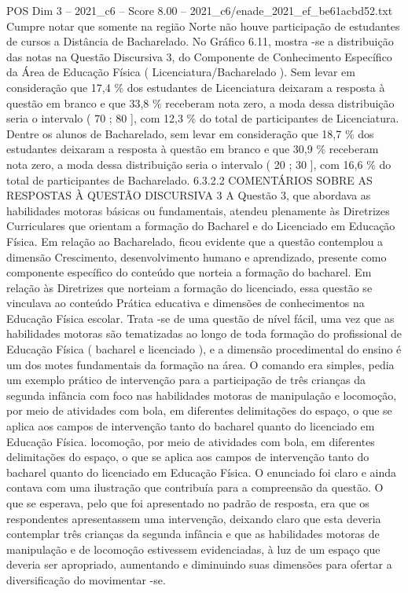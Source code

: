 \begin{textsample}{POS Dim 3 – 2021\_c6 – Score 8.00 – 2021\_c6/enade\_2021\_ef\_be61acbd52.txt}
Cumpre notar que somente na região Norte não houve participação de estudantes de cursos a Distância de Bacharelado.
No Gráfico 6.11, mostra -se a distribuição das notas na Questão Discursiva 3, do Componente de Conhecimento Específico da Área de Educação Física ( Licenciatura/Bacharelado ).
Sem levar em consideração que 17,4 \% dos estudantes de Licenciatura deixaram a resposta à questão em branco e que 33,8 \% receberam nota zero, a moda dessa distribuição seria o intervalo ( 70 ; 80 ], com 12,3 \% do total de participantes de Licenciatura.
Dentre os alunos de Bacharelado, sem levar em consideração que 18,7 \% dos estudantes deixaram a resposta à questão em branco e que 30,9 \% receberam nota zero, a moda dessa distribuição seria o intervalo ( 20 ; 30 ], com 16,6 \% do total de participantes de Bacharelado. 6.3.2.2 COMENTÁRIOS SOBRE AS RESPOSTAS À QUESTÃO DISCURSIVA 3 A Questão 3, que abordava as habilidades motoras básicas ou fundamentais, atendeu plenamente às Diretrizes Curriculares que orientam a formação do Bacharel e do Licenciado em Educação Física.
Em relação ao Bacharelado, ficou evidente que a questão contemplou a dimensão Crescimento, desenvolvimento humano e aprendizado, presente como componente específico do conteúdo que norteia a formação do bacharel.
Em relação às Diretrizes que norteiam a formação do licenciado, essa questão se vinculava ao conteúdo Prática educativa e dimensões de conhecimentos na Educação Física escolar.
Trata -se de uma questão de nível fácil, uma vez que as habilidades motoras são tematizadas ao longo de toda formação do profissional de Educação Física ( bacharel e licenciado ), e a dimensão procedimental do ensino é um dos motes fundamentais da formação na área.
O comando era simples, pedia um exemplo prático de intervenção para a participação de três crianças da segunda infância com foco nas habilidades motoras de manipulação e locomoção, por meio de atividades com bola, em diferentes delimitações do espaço, o que se aplica aos campos de intervenção tanto do bacharel quanto do licenciado em Educação Física. locomoção, por meio de atividades com bola, em diferentes delimitações do espaço, o que se aplica aos campos de intervenção tanto do bacharel quanto do licenciado em Educação Física.
O enunciado foi claro e ainda contava com uma ilustração que contribuía para a compreensão da questão.
O que se esperava, pelo que foi apresentado no padrão de resposta, era que os respondentes apresentassem uma intervenção, deixando claro que esta deveria contemplar três crianças da segunda infância e que as habilidades motoras de manipulação e de locomoção estivessem evidenciadas, à luz de um espaço que deveria ser apropriado, aumentando e diminuindo suas dimensões para ofertar a diversificação do movimentar -se.

\end{textsample}
